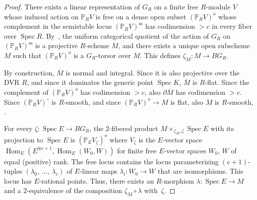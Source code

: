 \documentclass[11pt]{article}
\theoremstyle{definition}
\numberwithin{equation}{section}
\numberwithin{figure}{section}
\numberwithin{table}{section}
\newcommand{\mbb}{\mathbb}
\newcommand{\PP}{\mbb{P}}
\newcommand{\ol}{\overline}
\newcommand{\FR}{K}
\DeclareMathOperator{\SP}{Spec}
\DeclareMathOperator{\Hom}{Hom}
\DeclareMathOperator{\ssl}{ss}
\begin{document}
\begin{proof}
There exists a linear representation of $G_R$ on a finite free $R$-module $V$ whose induced action on $\PP_R V$ is free on a dense open subset $(\PP_R V)^o$ whose complement in the semistable locus $(\PP_R V)^{\ssl}$ has codimension $>c$ in every fiber over $\SP R$. By~\cite{Sesh}, the uniform categorical quotient of the action of $G_R$ on $(\PP_R V)^{\ssl}$ is a projective $R$-scheme $\ol{M}$, and there exists a unique open subscheme $M$ such that $(\PP_R V)^o$ is a $G_R$-torsor over $M$. This defines $\zeta_M:M\to BG_R$.

By construction, $\ol{M}$ is normal and integral. Since it is also projective over the DVR $R$, and since it dominates the generic point $\SP \FR$, $\ol{M}$ is $R$-flat. Since the complement of $(\PP_R V)^o$ has codimension $>c$, also $\partial \ol{M}$ has codimension $>c$. Since $(\PP_R V)^\circ$ is $R$-smooth, and since $(\PP_R V)^o\to M$ is flat, also $M$ is $R$-smooth, \cite[Proposition~17.7.7]{EGA4}.

For every $\zeta:\SP E \to BG_R$, the $2$-fibered product $M\times_{\zeta_M,\zeta} \SP E$ with its projection to $\SP E$ is $(\PP_E V_\zeta)^o$ where $V_\zeta$ is the $E$-vector space $\Hom_E(E^{\oplus c+1},\Hom_E(W_0,W)\! )$ for finite free $E$-vector spaces $W_0$, $W$ of equal (positive) rank. The free locus contains the locus parameterizing $(c+1)$-tuples $(\lambda_0,\,\dots,\,\lambda_c)$ of $E$-linear maps $\lambda_i:W_0\to W$ that are isomorphisms. This locus has $E$-rational points. Thus, there exists an $R$-morphism $\lambda:\SP E \to M$ and a $2$-equivalence of the composition $\zeta_M\circ \lambda$ with~$\zeta$.
\end{proof}
\end{document}
